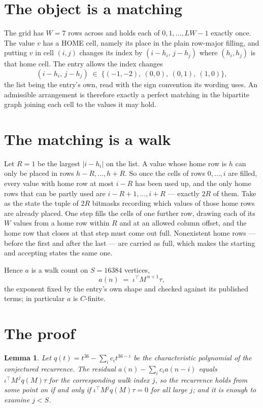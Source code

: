 \documentclass[11pt,a4paper]{article}
\theoremstyle{plain}
\newtheorem{lemma}[theorem]{Lemma}
\theoremstyle{definition}
\begin{document}
\section{The object is a matching}

The grid has $W=7$ rows across and holds each of $0,1,\dots,LW-1$ exactly once. The value
$v$ has a HOME cell, namely its place in the plain row-major filling, and putting $v$ in cell
$(i,j)$ changes its index by $(i-h_i,\,j-h_j)$ where $(h_i,h_j)$ is that home cell. The entry
allows the index changes
\[
(i-h_i,\,j-h_j)\;\in\;\{(-1,-2),\ (0,0),\ (0,1),\ (1,0)\},
\]
the list being the entry's own, read with the sign convention its wording uses. An admissible
arrangement is therefore exactly a perfect matching in the bipartite graph joining each cell to
the values it may hold.

\section{The matching is a walk}

Let $R=1$ be the largest $|i-h_i|$ on the list. A value whose home row is $h$ can only be
placed in rows $h-R,\dots,h+R$. So once the cells of rows $0,\dots,i$ are filled, every
value with home row at most $i-R$ has been used up, and the only home rows that can be
partly used are $i-R+1,\dots,i+R$ --- exactly $2R$ of them. Take as the state the tuple of
$2R$ bitmasks recording which values of those home rows are already placed. One step fills
the cells of one further row, drawing each of its $W$ values from a home row within $R$
and at an allowed column offset, and the home row that closes at that step must come out
full. Nonexistent home rows --- before the first and after the last --- are carried as
full, which makes the starting and accepting states the same one.

Hence $a$ is a walk count on $S=16384$ vertices,
\[
a(n)\;=\;\iota^{\!\top}M^{\,n+1}\tau ,
\]
the exponent fixed by the entry's own shape and checked against its published terms; in
particular $a$ is $C$-finite.

\section{The proof}

\begin{lemma}\label{lem:crit}
Let $q(t)=t^{36}-\sum_i c_it^{36-i}$ be the characteristic polynomial of the
conjectured recurrence. The residual $a(n)-\sum_ic_ia(n-i)$ equals
$\iota^{\!\top}M^{\,j}q(M)\tau$ for the corresponding walk index $j$, so the recurrence
holds from some point on if and only if $\iota^{\!\top}M^{j}q(M)\tau=0$ for all large $j$;
and it is enough to examine $j<S$.
\end{lemma}
\end{document}
